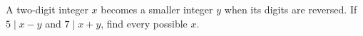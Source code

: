 A two-digit integer $x$ becomes a smaller integer $y$ when its digits are reversed. If $5\mid x-y$ and $7\mid x+y$, find every possible $x$.
